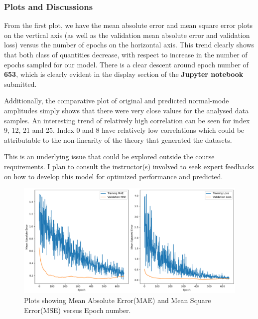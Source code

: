 \documentclass[conference]{IEEEtran}
\begin{document}
\subsubsection{Plots and Discussions}
From the first plot, we have the mean absolute error and mean square error plots on the vertical axis (as well as the validation mean absolute error and validation loss) versus the number of epochs on the horizontal axis. This trend clearly shows that both class of quantities decrease, with respect to increase in the number of epochs sampled for our model. There is a clear descent around epoch number of \textbf{653}, which is clearly evident in the display section of the \textbf{Jupyter notebook} submitted. 

Additionally, the comparative plot of original and predicted normal-mode amplitudes simply shows that there were very close values for the analysed data samples. An interesting trend of relatively high correlation can be seen for index 9, 12, 21 and 25. Index 0 and 8 have relatively low correlations which could be attributable to the non-linearity of the theory that generated the datasets. 

This is an underlying issue that could be explored outside the course requirements. I plan to consult the instructor(s) involved to seek expert feedbacks on how to develop this model for optimized performance and predicted.

\begin{figure}
    \centering
    \includegraphics[width=1\linewidth]{accuracy_plots_deeplearning.png}
    \caption{Plots showing Mean Absolute Error(MAE) and Mean Square Error(MSE) versus Epoch number.}
    \label{fig:enter-label}
\end{figure}
\end{document}
